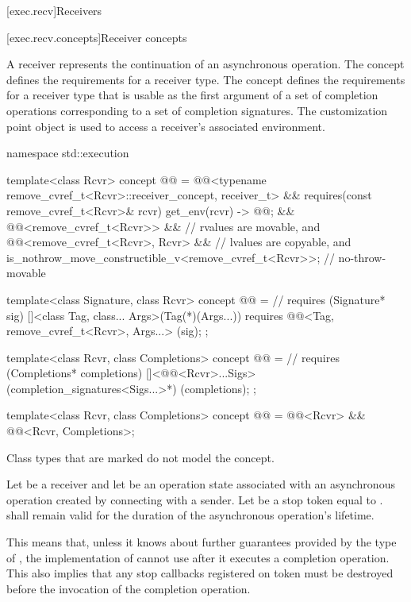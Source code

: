 [exec.recv]{Receivers}

[exec.recv.concepts]{Receiver concepts}

\pnum
A receiver represents the continuation of an asynchronous operation.
The  concept defines
the requirements for a receiver type.
The  concept defines
the requirements for a receiver type that is usable as
the first argument of a set of completion operations
corresponding to a set of completion signatures.
The  customization point object is used to access
a receiver's associated environment.
\begin{codeblock}
namespace std::execution {
  template<class Rcvr>
    concept @@ =
      @@<typename remove_cvref_t<Rcvr>::receiver_concept, receiver_t> &&
      requires(const remove_cvref_t<Rcvr>& rcvr) {
        { get_env(rcvr) } -> @@;
      } &&
      @@<remove_cvref_t<Rcvr>> &&               // rvalues are movable, and
      @@<remove_cvref_t<Rcvr>, Rcvr> &&         // lvalues are copyable, and
      is_nothrow_move_constructible_v<remove_cvref_t<Rcvr>>;    // no-throw-movable

  template<class Signature, class Rcvr>
    concept @@ =                 // \expos
      requires (Signature* sig) {
        []<class Tag, class... Args>(Tag(*)(Args...))
            requires @@<Tag, remove_cvref_t<Rcvr>, Args...>
        {}(sig);
      };

  template<class Rcvr, class Completions>
    concept @@ =                      // \expos
      requires (Completions* completions) {
        []<@@<Rcvr>...Sigs>(completion_signatures<Sigs...>*)
        {}(completions);
      };

  template<class Rcvr, class Completions>
    concept @@ =
      @@<Rcvr> && @@<Rcvr, Completions>;
}
\end{codeblock}

\pnum
Class types that are marked  do not model the  concept.

\pnum
Let  be a receiver and
let  be an operation state associated with
an asynchronous operation created by connecting  with a sender.
Let  be a stop token equal to
.
 shall remain valid
for the duration of the asynchronous operation's lifetime.
\begin{note}
This means that, unless it knows about further guarantees
provided by the type of ,
the implementation of  cannot use 
after it executes a completion operation.
This also implies that any stop callbacks registered on token
must be destroyed before the invocation of the completion operation.
\end{note}

